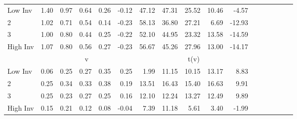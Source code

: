 \begin{table}[!ht]
\begin{tabular}{lrrrrrrrrrrrrrrrr}
    \\
      \cmidrule(r){2-5} \cmidrule(r){6-9} \cmidrule(r){10-13} \cmidrule(r){14-17}

    Low Inv   & 1.40  & 0.97  & 0.64  & 0.26  & -0.12  & 47.12  & 47.31  & 25.52  & 10.46  & -4.57  \\
           2  & 1.02  & 0.71  & 0.54  & 0.14  & -0.23  & 58.13  & 36.80  & 27.21  & 6.69  & -12.93  \\
           3  & 1.00  & 0.80  & 0.44  & 0.25  & -0.22  & 52.10  & 44.95  & 23.32  & 13.58  & -14.59  \\
    High Inv  & 1.07  & 0.80  & 0.56  & 0.27  & -0.23  & 56.67  & 45.26  & 27.96  & 13.00  & -14.17  \\

  
    
      & \multicolumn{5}{c}{v} & \multicolumn{5}{c}{t(v)}
    
    \\
      \cmidrule(r){2-5} \cmidrule(r){6-9} \cmidrule(r){10-13} \cmidrule(r){14-17}

    Low Inv   & 0.06  & 0.25  & 0.27  & 0.35  & 0.25  & 1.99  & 11.15  & 10.15  & 13.17  & 8.83  \\
           2  & 0.25  & 0.34  & 0.33  & 0.38  & 0.19  & 13.51  & 16.43  & 15.40  & 16.63  & 9.91  \\
           3  & 0.25  & 0.23  & 0.27  & 0.25  & 0.16  & 12.10  & 12.24  & 13.27  & 12.49  & 9.89  \\
    High Inv  & 0.15  & 0.21  & 0.12  & 0.08  & -0.04  & 7.39  & 11.18  & 5.61  & 3.40  & -1.99  \\

  

  \bottomrule
\end{tabular}
\label{tbl:25_Size_BM_Inv_FF1993}
\end{table}